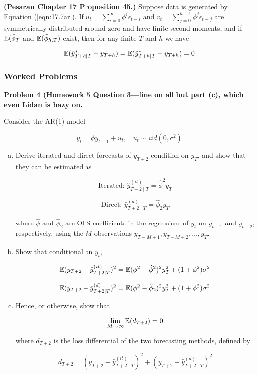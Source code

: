 \begin{proposition}\textbf{(Pesaran Chapter 17 Proposition 45.)} Suppose data is generated by Equation (\ref{eqn:17.7ar}). If \(u_t = \sum_{i=0}^\infty \phi^i \epsilon_{t-i}\) and \(v_t = \sum_{j=0}^{h-1} \phi^j \epsilon_{t-j}\) are symmetrically distributed around zero and have finite second moments, and if \(\E(\hat{\phi}_T\) and \(\E(\tilde{\phi}_{h,T} )\) exist, then for any finite \(T\) and \(h\) we have

\[
\E(\hat{y}_{T+h \mid T}^* - y_{T +h}) = \E (\tilde{y}_{T+h \mid T}^* - y_{T+h}) = 0
\]
\end{proposition}

\subsubsection{Worked Problems}

\textbf{Problem 4 (Homework 5 Question 3---fine on all but part (c), which even Lidan is hazy on.}

Consider the AR(1) model

\begin{equation} \label{eqn:17.7ar}
y_t =  \phi y_{t-1} + u_t, \ \ \ \ u_t \sim iid(0, \sigma^2)
\end{equation}

\begin{enumerate}[(a)]

\item Derive iterated and direct forecasts of \(y_{T+2}\) condition on \(y_T\), and show that they can be estimated as 

\[
\text{Iterated: } \hat{y}_{T+2\mid T}^{(it)} = \hat{\phi}^2 y_T
\]

\[
\text{Direct: } \hat{y}_{T+2\mid T}^{(d)} = \hat{\phi}_2 y_T
\]

where \(\hat{\phi}\) and \( \hat{\phi}_2\) are OLS coefficients in the regressions of \(y_t\) on \(y_{t-1}\) and \(y_{t-2}\), respectively, using the \(M\) observations \(y_{T-M+1}, y_{T-M+2}, \ldots, y_{T}\).

\item Show that conditional on \(y_t\),

\[
\E(y_{T+2} - \hat{y}_{T+2\mid T}^{(it)})^2 = \E(\phi^2 - \hat{\phi}^2)^2 y_T^2 + (1 + \phi^2)\sigma^2
\]

\[
\E(y_{T+2} - \hat{y}_{T+2\mid T}^{(d)})^2 = \E(\phi^2 - \hat{\phi}_2)^2 y_T^2 + (1 + \phi^2)\sigma^2
\]

\item Hence, or otherwise, show that

\[
\lim_{M \to \infty} \E(d_{T+2}) = 0
\]

where \(d_{T+2}\) is the loss differential of the two forecasting methods, defined by

\[
d_{T+2} = (y_{T+2}- \hat{y}_{T+2\mid T}^{(it)})^2 + (y_{T+2} - \hat{y}_{T+2\mid T}^{(d)})^2
\]

\end{enumerate}

